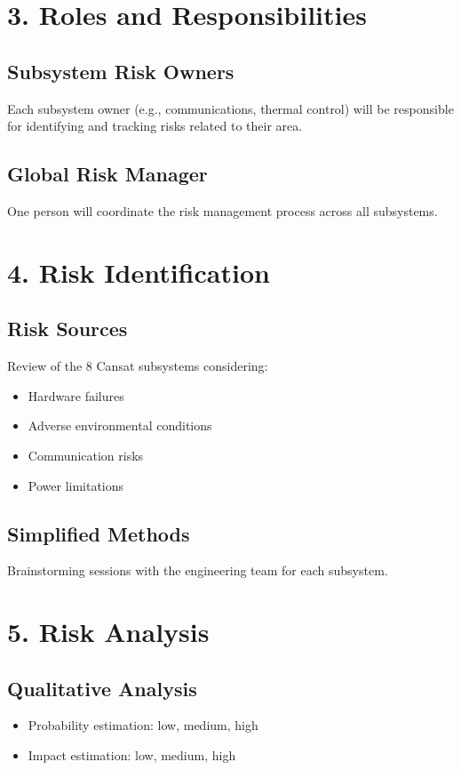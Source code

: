 \documentclass{article}
\begin{document}
\section*{3. Roles and Responsibilities}

\subsection*{Subsystem Risk Owners}
Each subsystem owner (e.g., communications, thermal control) will be responsible for identifying and tracking risks related to their area.

\subsection*{Global Risk Manager}
One person will coordinate the risk management process across all subsystems.

\section*{4. Risk Identification}

\subsection*{Risk Sources}
Review of the 8 Cansat subsystems considering:
\begin{itemize}
    \item Hardware failures
    \item Adverse environmental conditions
    \item Communication risks
    \item Power limitations
\end{itemize}

\subsection*{Simplified Methods}
Brainstorming sessions with the engineering team for each subsystem.

\section*{5. Risk Analysis}

\subsection*{Qualitative Analysis}
\begin{itemize}
    \item Probability estimation: low, medium, high
    \item Impact estimation: low, medium, high
\end{itemize}
\end{document}
